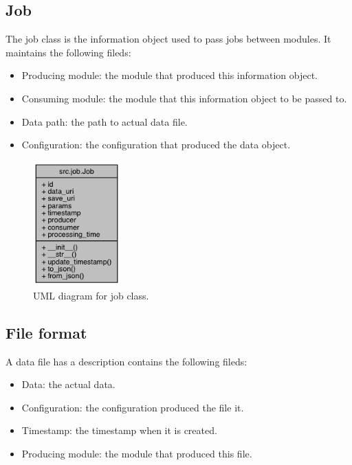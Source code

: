 \documentclass{article}
\begin{document}
    \subsection{Job}
    \label{sec:infomation_object}
    The job class is the information object used to pass jobs between modules.
    It maintains the following fileds:
    \begin{itemize}
        \item Producing module: the module that produced this information object.
        \item Consuming module: the module that this information object to be passed to.
        \item Data path: the path to actual data file.
        \item Configuration: the configuration that produced the data object.
    \end{itemize}


    \begin{figure}[H]
        \begin{center}
            \includegraphics[width=0.3\textwidth]{fig/job_uml.png}
        \end{center}
        \label{fig:job_uml}
        \caption{UML diagram for job class.}
    \end{figure}


    \subsection{File format}
    A data file has a description contains the following fileds:
    \begin{itemize}
        \item Data: the actual data.
        \item Configuration: the configuration produced the file it.
        \item Timestamp: the timestamp when it is created.
        \item Producing module: the module that produced this file.
    \end{itemize}
\end{document}
